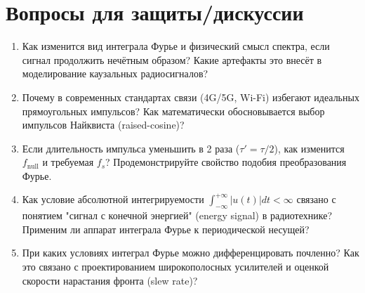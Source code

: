 \documentclass[12pt,a4paper]{article}
\begin{document}
\section{Вопросы для защиты/дискуссии}
\begin{enumerate}[label=\alph*)]
    \item Как изменится вид интеграла Фурье и физический смысл спектра, если сигнал продолжить нечётным образом? Какие артефакты это внесёт в моделирование каузальных радиосигналов?
    \item Почему в современных стандартах связи (4G/5G, Wi-Fi) избегают идеальных прямоугольных импульсов? Как математически обосновывается выбор импульсов Найквиста (raised-cosine)?
    \item Если длительность импульса уменьшить в 2 раза ($\tau' = \tau/2$), как изменится $f_{\text{null}}$ и требуемая $f_s$? Продемонстрируйте свойство подобия преобразования Фурье.
    \item Как условие абсолютной интегрируемости $\int_{-\infty}^{+\infty} |u(t)| dt < \infty$ связано с понятием "сигнал с конечной энергией" (energy signal) в радиотехнике? Применим ли аппарат интеграла Фурье к периодической несущей?
    \item При каких условиях интеграл Фурье можно дифференцировать почленно? Как это связано с проектированием широкополосных усилителей и оценкой скорости нарастания фронта (slew rate)?
\end{enumerate}
\end{document}
